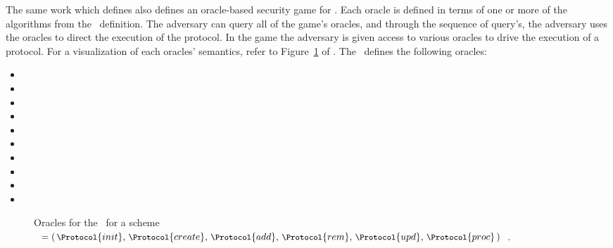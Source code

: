The same work which defines  also defines an oracle-based security game for .
Each oracle is defined in terms of one or more of the algorithms from the \CGKAdef\ definition.
The adversary can query all of the game's oracles, and through the sequence of query's, the adversary uses the oracles to direct the execution of the  protocol.
In the game the adversary is given access to various oracles to drive the execution of a  protocol.
For a visualization of each oracles' semantics, refer to Figure\ \ref{fig:CGKA-Oracles} of \autocite{alwen2020security}.
The \CGKAsec\ defines the following oracles:

\begin{itemize}
\item {}
\item {}
\item {}
\item {}
\item {}
\item {}
\item {}
\item {}
\item {}
\item {}
\end{itemize}

\begin{figure}[ht!]
\centering
\caption[Oracles for the \CGKAsec]{%
\label{fig:CGKA-Oracles}%
Oracles for the \CGKAsec\ for a scheme \CGKAdef\ \(= \small\left(\,\Protocol{init},\, \Protocol{create},\, \Protocol{add},\, \Protocol{rem},\, \Protocol{upd},\, \Protocol{proc}\,\right)\).
}%
{}
\end{figure}

